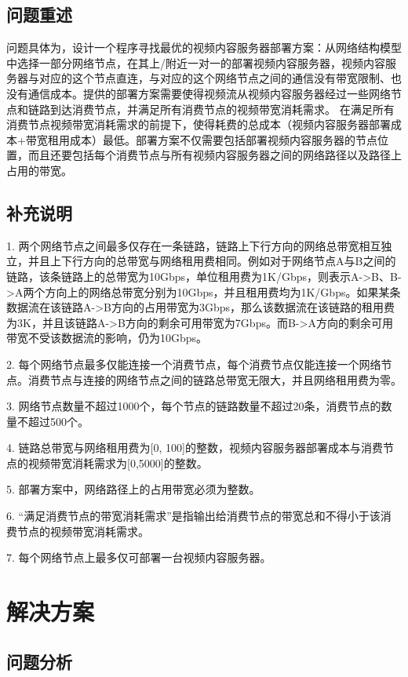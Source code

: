 \documentclass[a4paper,11pt,onecolumn,twoside]{article}
\begin{document}
\begin{multicols}{2}
\subsection{问题重述}

问题具体为，设计一个程序寻找最优的视频内容服务器部署方案：从网络结构模型中选择一部分网络节点，在其上/附近一对一的部署视频内容服务器，视频内容服务器与对应的这个节点直连，与对应的这个网络节点之间的通信没有带宽限制、也没有通信成本。提供的部署方案需要使得视频流从视频内容服务器经过一些网络节点和链路到达消费节点，并满足所有消费节点的视频带宽消耗需求。
在满足所有消费节点视频带宽消耗需求的前提下，使得耗费的总成本（视频内容服务器部署成本+带宽租用成本）最低。部署方案不仅需要包括部署视频内容服务器的节点位置，而且还要包括每个消费节点与所有视频内容服务器之间的网络路径以及路径上占用的带宽。

\subsection{补充说明}
1. 两个网络节点之间最多仅存在一条链路，链路上下行方向的网络总带宽相互独立，并且上下行方向的总带宽与网络租用费相同。例如对于网络节点A与B之间的链路，该条链路上的总带宽为10Gbps，单位租用费为1K/Gbps，则表示A->B、B->A两个方向上的网络总带宽分别为10Gbps，并且租用费均为1K/Gbps。如果某条数据流在该链路A->B方向的占用带宽为3Gbps，那么该数据流在该链路的租用费为3K，并且该链路A->B方向的剩余可用带宽为7Gbps。而B->A方向的剩余可用带宽不受该数据流的影响，仍为10Gbps。

2. 每个网络节点最多仅能连接一个消费节点，每个消费节点仅能连接一个网络节点。消费节点与连接的网络节点之间的链路总带宽无限大，并且网络租用费为零。

3. 网络节点数量不超过1000个，每个节点的链路数量不超过20条，消费节点的数量不超过500个。

4. 链路总带宽与网络租用费为[0, 100]的整数，视频内容服务器部署成本与消费节点的视频带宽消耗需求为[0,5000]的整数。

5. 部署方案中，网络路径上的占用带宽必须为整数。

6. “满足消费节点的带宽消耗需求”是指输出给消费节点的带宽总和不得小于该消费节点的视频带宽消耗需求。

7. 每个网络节点上最多仅可部署一台视频内容服务器。

\section{解决方案}

\subsection{问题分析}


\end{multicols}
\end{document}
